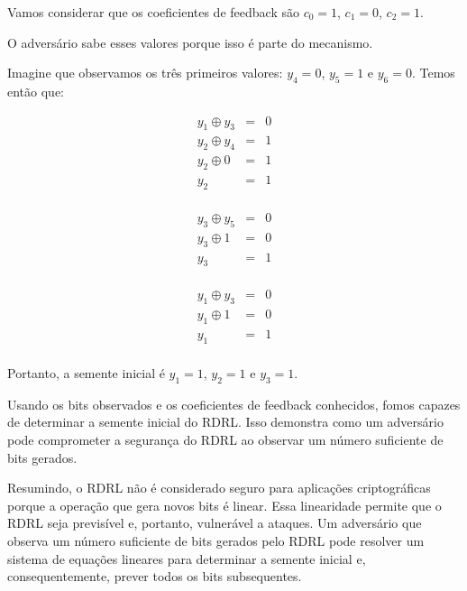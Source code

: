 \begin{example}
  Vamos considerar que os coeficientes de feedback são $c_0 = 1$, $c_1 = 0$, $c_2 = 1$.

  O adversário sabe esses valores porque isso é parte do mecanismo.

  Imagine que observamos os três primeiros valores: $y_4 = 0$, $y_5 = 1$ e $y_6 = 0$.
  Temos então que:

  \begin{displaymath}
    \begin{array}{rcl}
      y_1 \oplus y_3 & = & 0 \\
      y_2 \oplus y_4 & = & 1 \\
      y_2 \oplus 0 & = & 1\\
      y_2 & = & 1 \\
    \end{array}
  \end{displaymath}

  \begin{displaymath}
    \begin{array}{rcl}
      y_3 \oplus y_5 & = & 0 \\
      y_3 \oplus 1 & = & 0 \\
      y_3 & = & 1 \\
    \end{array}
  \end{displaymath}

  \begin{displaymath}
    \begin{array}{rcl}
      y_1 \oplus y_3 & = & 0 \\
      y_1 \oplus 1 & = &  0\\
      y_1 & = & 1 \\
    \end{array}
  \end{displaymath}

  Portanto, a semente inicial é $y_1 = 1$, $y_2 = 1$ e $y_3 = 1$.

  Usando os bits observados e os coeficientes de feedback conhecidos, fomos capazes de determinar a semente inicial do RDRL.
  Isso demonstra como um adversário pode comprometer a segurança do RDRL ao observar um número suficiente de bits gerados.
\end{example}

Resumindo, o RDRL não é considerado seguro para aplicações criptográficas porque a operação que gera novos bits é linear.
Essa linearidade permite que o RDRL seja previsível e, portanto, vulnerável a ataques.
Um adversário que observa um número suficiente de bits gerados pelo RDRL pode resolver um sistema de equações lineares para determinar a semente inicial e, consequentemente, prever todos os bits subsequentes.

